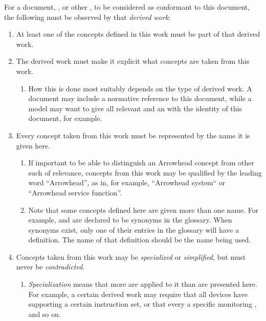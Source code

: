 %
%

For a document, , or other , to be considered as conformant to this document, the following must be observed by that \textit{derived work}:

\begin{enumerate}
\item At least one of the concepts defined in this work must be part of that derived work.
\item The derived work must make it explicit what concepts are taken from this work.
	\begin{enumerate}
	\item How this is done most suitably depends on the type of derived work. A document may include a normative reference to this document, while a model may want to give all relevant  and  an  with the identity of this document, for example.
	\end{enumerate}
\item Every concept taken from this work must be represented by the name it is given here.
	\begin{enumerate}
	\item If important to be able to distinguish an Arrowhead concept from other such of relevance, concepts from this work may be qualified by the leading word ``Arrowhead'', as in, for example, ``Arrowhead system`` or ``Arrowhead service function''.
	\item Note that some concepts defined here are given more than one name. For example,  and  are declared to be synonyms in the glossary. When synonyms exist, only one of their entries in the glossary will have a definition. The name of that definition should be the name being used.
	\end{enumerate}
\item Concepts taken from this work may be \textit{specialized} or \textit{simplified}, but must never be \textit{contradicted}.
	\begin{enumerate}
	\item \textit{Specialization} means that more  are applied to it than are presented here. For example, a certain derived work may require that all devices have  supporting a certain instruction set, or that every   a specific monitoring , and so on.

\end{enumerate}
\end{enumerate}
